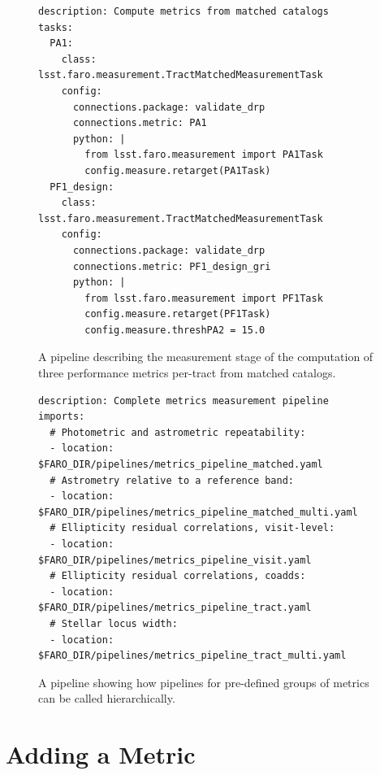 \begin{figure}[!ht]
  \lstset{language=YAML}
  \begin{lstlisting}
description: Compute metrics from matched catalogs
tasks:
  PA1:
    class: lsst.faro.measurement.TractMatchedMeasurementTask
    config:
      connections.package: validate_drp
      connections.metric: PA1
      python: |
        from lsst.faro.measurement import PA1Task
        config.measure.retarget(PA1Task)
  PF1_design:
    class: lsst.faro.measurement.TractMatchedMeasurementTask
    config:
      connections.package: validate_drp
      connections.metric: PF1_design_gri
      python: |
        from lsst.faro.measurement import PF1Task
        config.measure.retarget(PF1Task)
        config.measure.threshPA2 = 15.0
    \end{lstlisting}
  \caption{A \faro pipeline describing the measurement stage of the computation of three performance metrics per-tract from matched catalogs.}
  \label{fig:faro_pipeline}
\end{figure}

\begin{figure}[!ht]
  \lstset{language=YAML}
  \begin{lstlisting}
description: Complete metrics measurement pipeline
imports:
  # Photometric and astrometric repeatability:
  - location: $FARO_DIR/pipelines/metrics_pipeline_matched.yaml
  # Astrometry relative to a reference band:
  - location: $FARO_DIR/pipelines/metrics_pipeline_matched_multi.yaml
  # Ellipticity residual correlations, visit-level:
  - location: $FARO_DIR/pipelines/metrics_pipeline_visit.yaml
  # Ellipticity residual correlations, coadds:
  - location: $FARO_DIR/pipelines/metrics_pipeline_tract.yaml
  # Stellar locus width:
  - location: $FARO_DIR/pipelines/metrics_pipeline_tract_multi.yaml
    \end{lstlisting}
  \caption{A \faro pipeline showing how pipelines for pre-defined groups of metrics can be called hierarchically.}
  \label{fig:faro_pipeline_hierarchy}
\end{figure}

\section{Adding a  Metric} \label{sec:add}

